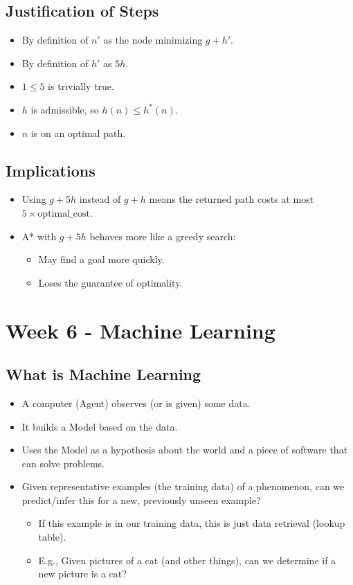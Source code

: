 \documentclass[8pt]{article}
\begin{document}
\subsection*{Justification of Steps}
\begin{itemize}
    \item By definition of \( n' \) as the node minimizing \( g + h' \).
    \item By definition of \( h' \) as \( 5h \).
    \item \( 1 \leq 5 \) is trivially true.
    \item \( h \) is admissible, so \( h(n) \leq h^*(n) \).
    \item \( n \) is on an optimal path.
\end{itemize}

\subsection*{Implications}
\begin{itemize}
    \item Using \( g + 5h \) instead of \( g + h \) means the returned path costs at most \( 5 \times \text{optimal\_cost} \).
    \item A* with \( g + 5h \) behaves more like a greedy search:
    \begin{itemize}
        \item May find a goal more quickly.
        \item Loses the guarantee of optimality.
    \end{itemize}
\end{itemize}
\newpage

\section{Week 6 - Machine Learning}
\subsection*{What is Machine Learning}
\begin{itemize}
    \item A computer (Agent) observes (or is given) some data.
    \item It builds a Model based on the data.
    \item Uses the Model as a hypothesis about the world and a piece of software that can solve problems.
    \item Given representative examples (the training data) of a phenomenon, can we predict/infer this for a new, previously unseen example? 
    \begin{itemize}
        \item If this example is in our training data, this is just data retrieval (lookup table).
        \item E.g., Given pictures of a cat (and other things), can we determine if a new picture is a cat?
    \end{itemize}
\end{itemize}
\end{document}
